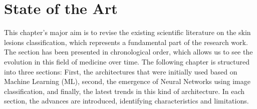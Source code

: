 \chapter{State of the Art}
\label{chapter: State of the Art}


This chapter's major aim is to revise the existing scientific literature on the skin lesions classification, which represents a fundamental part of the research work. The section has been presented in chronological order, which allows us to see the evolution in this field of medicine over time. The following chapter is structured into three sections: First, the architectures that were initially used based on Machine Learning (ML), second, the emergence of Neural Networks using image classification, and finally, the latest trends in this kind of architecture. In each section, the advances are introduced, identifying characteristics and limitations.

